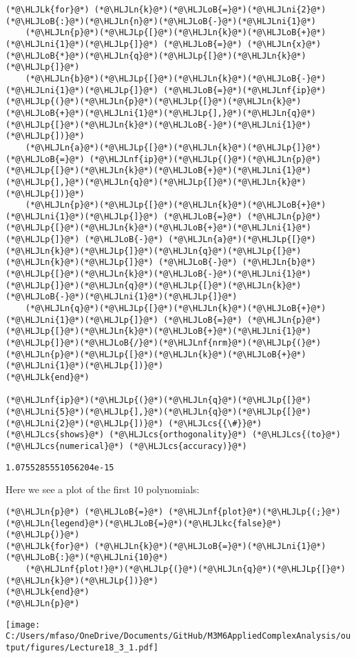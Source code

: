 \documentclass[12pt,landscape]{article}
\newcommand{\HLJLk}[1]{\textcolor[RGB]{148,91,176}{\textbf{#1}}}
\newcommand{\HLJLkc}[1]{\textcolor[RGB]{59,151,46}{\textit{#1}}}
\newcommand{\HLJLn}[1]{#1}
\newcommand{\HLJLnf}[1]{\textcolor[RGB]{66,102,213}{#1}}
\newcommand{\HLJLni}[1]{\textcolor[RGB]{59,151,46}{#1}}
\newcommand{\HLJLoB}[1]{\textcolor[RGB]{102,102,102}{\textbf{#1}}}
\newcommand{\HLJLp}[1]{#1}
\newcommand{\HLJLcs}[1]{\textcolor[RGB]{153,153,119}{\textit{#1}}}
\def\cent#1{\begin{center}#1\end{center} }
\begin{document}
{\begin{lstlisting}
(*@\HLJLk{for}@*) (*@\HLJLn{k}@*)(*@\HLJLoB{=}@*)(*@\HLJLni{2}@*)(*@\HLJLoB{:}@*)(*@\HLJLn{n}@*)(*@\HLJLoB{-}@*)(*@\HLJLni{1}@*)
    (*@\HLJLn{p}@*)(*@\HLJLp{[}@*)(*@\HLJLn{k}@*)(*@\HLJLoB{+}@*)(*@\HLJLni{1}@*)(*@\HLJLp{]}@*) (*@\HLJLoB{=}@*) (*@\HLJLn{x}@*)(*@\HLJLoB{*}@*)(*@\HLJLn{q}@*)(*@\HLJLp{[}@*)(*@\HLJLn{k}@*)(*@\HLJLp{]}@*)
    (*@\HLJLn{b}@*)(*@\HLJLp{[}@*)(*@\HLJLn{k}@*)(*@\HLJLoB{-}@*)(*@\HLJLni{1}@*)(*@\HLJLp{]}@*) (*@\HLJLoB{=}@*)(*@\HLJLnf{ip}@*)(*@\HLJLp{(}@*)(*@\HLJLn{p}@*)(*@\HLJLp{[}@*)(*@\HLJLn{k}@*)(*@\HLJLoB{+}@*)(*@\HLJLni{1}@*)(*@\HLJLp{],}@*)(*@\HLJLn{q}@*)(*@\HLJLp{[}@*)(*@\HLJLn{k}@*)(*@\HLJLoB{-}@*)(*@\HLJLni{1}@*)(*@\HLJLp{])}@*)
    (*@\HLJLn{a}@*)(*@\HLJLp{[}@*)(*@\HLJLn{k}@*)(*@\HLJLp{]}@*) (*@\HLJLoB{=}@*) (*@\HLJLnf{ip}@*)(*@\HLJLp{(}@*)(*@\HLJLn{p}@*)(*@\HLJLp{[}@*)(*@\HLJLn{k}@*)(*@\HLJLoB{+}@*)(*@\HLJLni{1}@*)(*@\HLJLp{],}@*)(*@\HLJLn{q}@*)(*@\HLJLp{[}@*)(*@\HLJLn{k}@*)(*@\HLJLp{])}@*)
    (*@\HLJLn{p}@*)(*@\HLJLp{[}@*)(*@\HLJLn{k}@*)(*@\HLJLoB{+}@*)(*@\HLJLni{1}@*)(*@\HLJLp{]}@*) (*@\HLJLoB{=}@*) (*@\HLJLn{p}@*)(*@\HLJLp{[}@*)(*@\HLJLn{k}@*)(*@\HLJLoB{+}@*)(*@\HLJLni{1}@*)(*@\HLJLp{]}@*) (*@\HLJLoB{-}@*) (*@\HLJLn{a}@*)(*@\HLJLp{[}@*)(*@\HLJLn{k}@*)(*@\HLJLp{]}@*)(*@\HLJLn{q}@*)(*@\HLJLp{[}@*)(*@\HLJLn{k}@*)(*@\HLJLp{]}@*) (*@\HLJLoB{-}@*) (*@\HLJLn{b}@*)(*@\HLJLp{[}@*)(*@\HLJLn{k}@*)(*@\HLJLoB{-}@*)(*@\HLJLni{1}@*)(*@\HLJLp{]}@*)(*@\HLJLn{q}@*)(*@\HLJLp{[}@*)(*@\HLJLn{k}@*)(*@\HLJLoB{-}@*)(*@\HLJLni{1}@*)(*@\HLJLp{]}@*)
    (*@\HLJLn{q}@*)(*@\HLJLp{[}@*)(*@\HLJLn{k}@*)(*@\HLJLoB{+}@*)(*@\HLJLni{1}@*)(*@\HLJLp{]}@*) (*@\HLJLoB{=}@*) (*@\HLJLn{p}@*)(*@\HLJLp{[}@*)(*@\HLJLn{k}@*)(*@\HLJLoB{+}@*)(*@\HLJLni{1}@*)(*@\HLJLp{]}@*)(*@\HLJLoB{/}@*)(*@\HLJLnf{nrm}@*)(*@\HLJLp{(}@*)(*@\HLJLn{p}@*)(*@\HLJLp{[}@*)(*@\HLJLn{k}@*)(*@\HLJLoB{+}@*)(*@\HLJLni{1}@*)(*@\HLJLp{])}@*)
(*@\HLJLk{end}@*)

(*@\HLJLnf{ip}@*)(*@\HLJLp{(}@*)(*@\HLJLn{q}@*)(*@\HLJLp{[}@*)(*@\HLJLni{5}@*)(*@\HLJLp{],}@*)(*@\HLJLn{q}@*)(*@\HLJLp{[}@*)(*@\HLJLni{2}@*)(*@\HLJLp{])}@*) (*@\HLJLcs{{\#}}@*) (*@\HLJLcs{shows}@*) (*@\HLJLcs{orthogonality}@*) (*@\HLJLcs{(to}@*) (*@\HLJLcs{numerical}@*) (*@\HLJLcs{accuracy)}@*)
\end{lstlisting}

\begin{lstlisting}
1.0755285551056204e-15
\end{lstlisting}


Here we see a plot of the first 10 polynomials:


\begin{lstlisting}
(*@\HLJLn{p}@*) (*@\HLJLoB{=}@*) (*@\HLJLnf{plot}@*)(*@\HLJLp{(;}@*) (*@\HLJLn{legend}@*)(*@\HLJLoB{=}@*)(*@\HLJLkc{false}@*)(*@\HLJLp{)}@*)
(*@\HLJLk{for}@*) (*@\HLJLn{k}@*)(*@\HLJLoB{=}@*)(*@\HLJLni{1}@*)(*@\HLJLoB{:}@*)(*@\HLJLni{10}@*)
    (*@\HLJLnf{plot!}@*)(*@\HLJLp{(}@*)(*@\HLJLn{q}@*)(*@\HLJLp{[}@*)(*@\HLJLn{k}@*)(*@\HLJLp{])}@*)
(*@\HLJLk{end}@*)
(*@\HLJLn{p}@*)
\end{lstlisting}

\cent{\texttt{[image: C:/Users/mfaso/OneDrive/Documents/GitHub/M3M6AppliedComplexAnalysis/output/figures/Lecture18\_3\_1.pdf]}}

}
\end{document}
